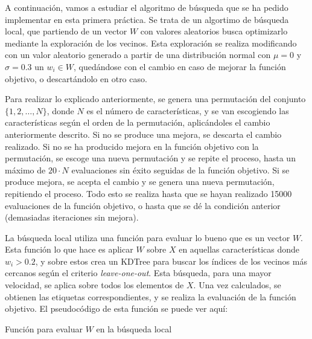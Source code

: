 \documentclass[11pt,a4paper]{article}
\begin{document}
A continuación, vamos a estudiar el algoritmo de búsqueda que se ha pedido implementar en esta primera práctica. Se trata de
un algortimo de búsqueda local, que partiendo de un vector $W$ con valores aleatorios busca optimizarlo mediante la
exploración de los vecinos. Esta exploración se realiza modificando con un valor aleatorio generado a partir de una
distribución normal con $\mu = 0$ y $\sigma = 0.3$ un $w_i \in W$, quedándose con el cambio en caso de mejorar la función
objetivo, o descartándolo en otro caso.

Para realizar lo explicado anteriormente, se genera una permutación del conjunto $\lbrace 1, 2, \dots , N \rbrace$, donde $N$
es el número de características, y se van escogiendo las características según el orden de la permutación, aplicándoles
el cambio anteriormente descrito. Si no se produce una mejora, se descarta el cambio realizado. Si no se ha producido mejora
en la función objetivo con la permutación, se escoge una nueva permutación y se repite el proceso, hasta un máximo de $20
\cdot N$ evaluaciones sin éxito seguidas de la función objetivo. Si se produce mejora, se acepta el cambio y se genera una
nueva permutación, repitiendo el proceso. Todo esto se realiza hasta que se hayan realizado 15000 evaluaciones de la función
objetivo, o hasta que se dé la condición anterior (demasiadas iteraciones sin mejora).

La búsqueda local utiliza una función para evaluar lo bueno que es un vector $W$. Esta función lo que hace es aplicar $W$ 
sobre $X$ en aquellas características donde $w_i > 0.2$, y sobre estos crea un KDTree para buscar los índices de los vecinos
más cercanos según el criterio \textit{leave-one-out}. Esta búsqueda, para una mayor velocidad, se aplica sobre todos los
elementos de $X$. Una vez calculados, se obtienen las etiquetas correspondientes, y se realiza la evaluación de la función
objetivo. El pseudocódigo de esta función se puede ver aquí:

\begin{algorithm}[H]
\caption{Función para evaluar $W$ en la búsqueda local}


\end{algorithm}
\end{document}

